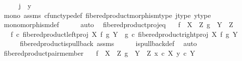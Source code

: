 \begin{isabellebody}
\ \ \isamarkupfalse%
\ \isamarkupfalse%
\ {\isachardoublequoteopen}j\ {\isacharequal}{\kern0pt}\ y{\isachardoublequoteclose}\isanewline
\ \ \ \ \isamarkupfalse%
\ mono\ assms\ cfunc{\isacharunderscore}{\kern0pt}type{\isacharunderscore}{\kern0pt}def\ fibered{\isacharunderscore}{\kern0pt}product{\isacharunderscore}{\kern0pt}morphism{\isacharunderscore}{\kern0pt}type\ j{\isacharunderscore}{\kern0pt}type\ y{\isacharunderscore}{\kern0pt}type\isanewline
\ \ \ \ \isamarkupfalse%
\ monomorphism{\isacharunderscore}{\kern0pt}def\isanewline
\ \ \ \ \isamarkupfalse%
\ auto\ \isanewline
{}\isamarkupfalse%
%
\endisatagproof
{\isafoldproof}%
%
\isadelimproof
\isanewline
%
\endisadelimproof
\isanewline
{}\isamarkupfalse%
\ fibered{\isacharunderscore}{\kern0pt}product{\isacharunderscore}{\kern0pt}proj{\isacharunderscore}{\kern0pt}eq{\isacharcolon}{\kern0pt}\isanewline
\ \ \ {\isachardoublequoteopen}f\ {\isacharcolon}{\kern0pt}\ X\ {\isasymrightarrow}\ Z{\isachardoublequoteclose}\ {\isachardoublequoteopen}g\ {\isacharcolon}{\kern0pt}\ Y\ {\isasymrightarrow}\ Z{\isachardoublequoteclose}\isanewline
\ \ \ {\isachardoublequoteopen}f\ {\isasymcirc}\isactrlsub c\ fibered{\isacharunderscore}{\kern0pt}product{\isacharunderscore}{\kern0pt}left{\isacharunderscore}{\kern0pt}proj\ X\ f\ g\ Y\ {\isacharequal}{\kern0pt}\ g\ {\isasymcirc}\isactrlsub c\ fibered{\isacharunderscore}{\kern0pt}product{\isacharunderscore}{\kern0pt}right{\isacharunderscore}{\kern0pt}proj\ X\ f\ g\ Y{\isachardoublequoteclose}\isanewline
%
\isadelimproof
\ \ \ \ %
\endisadelimproof
%
\isatagproof
{}\isamarkupfalse%
\ fibered{\isacharunderscore}{\kern0pt}product{\isacharunderscore}{\kern0pt}is{\isacharunderscore}{\kern0pt}pullback\ assms\isanewline
\ \ \ \ \isamarkupfalse%
\ is{\isacharunderscore}{\kern0pt}pullback{\isacharunderscore}{\kern0pt}def\ \isamarkupfalse%
\ auto%
\endisatagproof
{\isafoldproof}%
%
\isadelimproof
\isanewline
%
\endisadelimproof
\isanewline
{}\isamarkupfalse%
\ fibered{\isacharunderscore}{\kern0pt}product{\isacharunderscore}{\kern0pt}pair{\isacharunderscore}{\kern0pt}member{\isacharcolon}{\kern0pt}\isanewline
\ \ \ {\isachardoublequoteopen}f\ {\isacharcolon}{\kern0pt}\ X\ {\isasymrightarrow}\ Z{\isachardoublequoteclose}\ {\isachardoublequoteopen}g\ {\isacharcolon}{\kern0pt}\ Y\ {\isasymrightarrow}\ Z{\isachardoublequoteclose}\ {\isachardoublequoteopen}x\ {\isasymin}\isactrlsub c\ X{\isachardoublequoteclose}\ {\isachardoublequoteopen}y\ {\isasymin}\isactrlsub c\ Y{\isachardoublequoteclose}\isanewline

\end{isabellebody}
